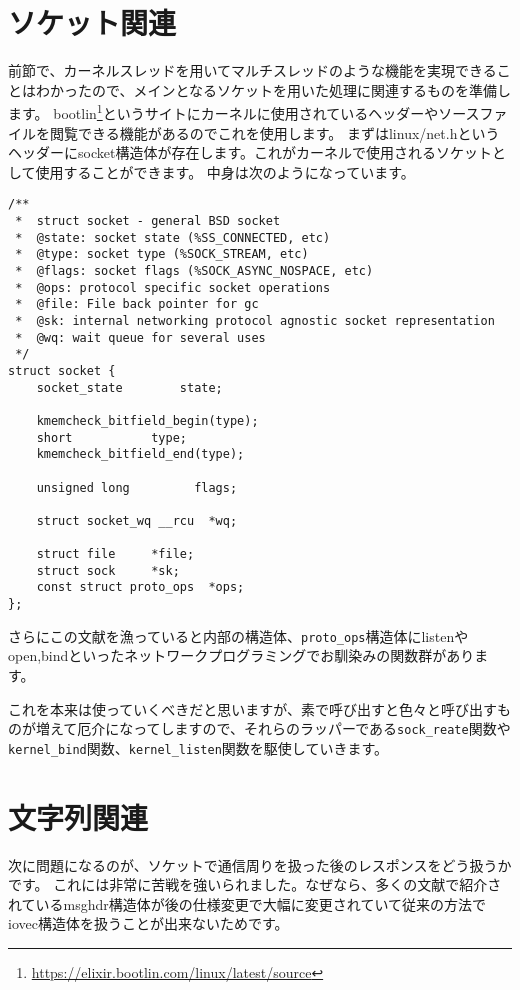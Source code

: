 \section{ソケット関連}

前節で、カーネルスレッドを用いてマルチスレッドのような機能を実現できることはわかったので、メインとなるソケットを用いた処理に関連するものを準備します。
bootlin\footnote{\url{https://elixir.bootlin.com/linux/latest/source}}というサイトにカーネルに使用されているヘッダーやソースファイルを閲覧できる機能があるのでこれを使用します。
まずはlinux/net.hというヘッダーにsocket構造体が存在します。これがカーネルで使用されるソケットとして使用することができます。
中身は次のようになっています。
\begin{verbatim}
/**
 *  struct socket - general BSD socket
 *  @state: socket state (%SS_CONNECTED, etc)
 *  @type: socket type (%SOCK_STREAM, etc)
 *  @flags: socket flags (%SOCK_ASYNC_NOSPACE, etc)
 *  @ops: protocol specific socket operations
 *  @file: File back pointer for gc
 *  @sk: internal networking protocol agnostic socket representation
 *  @wq: wait queue for several uses
 */
struct socket {
    socket_state        state;

    kmemcheck_bitfield_begin(type);
    short           type;
    kmemcheck_bitfield_end(type);

    unsigned long         flags;

    struct socket_wq __rcu  *wq;

    struct file     *file;
    struct sock     *sk;
    const struct proto_ops  *ops;
};
\end{verbatim}

さらにこの文献を漁っていると内部の構造体、\verb|proto_ops|構造体にlistenやopen,bindといったネットワークプログラミングでお馴染みの関数群があります。

これを本来は使っていくべきだと思いますが、素で呼び出すと色々と呼び出すものが増えて厄介になってしますので、それらのラッパーである\verb|sock_reate|関数や\verb|kernel_bind|関数、\verb|kernel_listen|関数を駆使していきます。

\section{文字列関連}
次に問題になるのが、ソケットで通信周りを扱った後のレスポンスをどう扱うかです。
これには非常に苦戦を強いられました。なぜなら、多くの文献で紹介されているmsghdr構造体が後の仕様変更で大幅に変更されていて従来の方法でiovec構造体を扱うことが出来ないためです。

